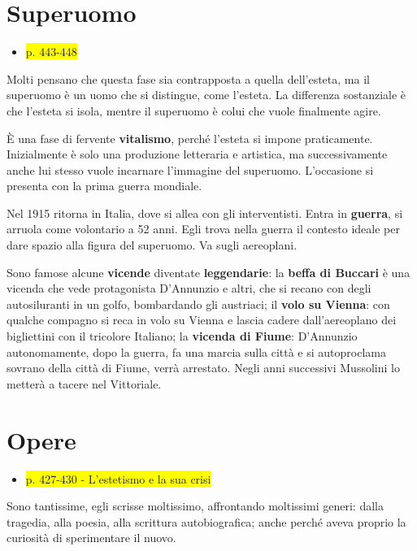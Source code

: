 \documentclass{book}
\newcommand{\pagine}[1]{\colorbox{yellow}{#1}}
\newcommand{\evidenziatore}[1]{\textbf{#1}}
\newcounter{mar}
\begin{document}
\section{Superuomo}

\begin{itemize}
\item
  \pagine{p. 443-448}
\end{itemize}

Molti pensano che questa fase sia contrapposta a quella dell'esteta, ma
il superuomo è un uomo che si distingue, come l'esteta. La differenza
sostanziale è che l'esteta si isola, mentre il superuomo è colui che
vuole finalmente agire.

È una fase di fervente \evidenziatore{vitalismo}, perché l'esteta si
impone praticamente. Inizialmente è solo una produzione letteraria e
artistica, ma successivamente anche lui stesso vuole incarnare
l'immagine del superuomo. L'occasione si presenta con la prima guerra
mondiale.

Nel 1915 ritorna in Italia, dove si allea con gli interventisti. Entra
in \evidenziatore{guerra}, si arruola come volontario a 52 anni. Egli
trova nella guerra il contesto ideale per dare spazio alla figura del
superuomo. Va sugli aereoplani.

Sono famose alcune \evidenziatore{vicende} diventate
\evidenziatore{leggendarie}: la \textbf{beffa di Buccari} è una vicenda
che vede protagonista D'Annunzio e altri, che si recano con degli
autosiluranti in un golfo, bombardando gli austriaci; il \textbf{volo su
Vienna}: con qualche compagno si reca in volo su Vienna e lascia cadere
dall'aereoplano dei bigliettini con il tricolore Italiano; la
\textbf{vicenda di Fiume}: D'Annunzio autonomamente, dopo la guerra, fa
una marcia sulla città e si autoproclama sovrano della città di Fiume,
verrà arrestato. Negli anni successivi Mussolini lo metterà a tacere nel
Vittoriale.

\section{Opere}

\begin{itemize}
\item
  \pagine{p. 427-430 - L'estetismo e la sua crisi}
\end{itemize}

Sono tantissime, egli scrisse moltissimo, affrontando moltissimi generi:
dalla tragedia, alla poesia, alla scrittura autobiografica; anche perché
aveva proprio la curiosità di sperimentare il nuovo.
\end{document}
